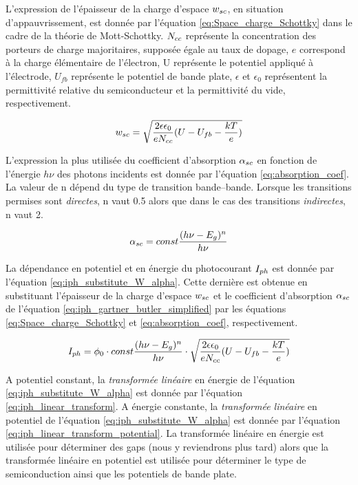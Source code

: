 \begin{refsection}
    L'expression de l'épaisseur de la charge d'espace $w_{sc}$, en situation d'appauvrissement, est donnée par
    l'équation \ref{eq:Space_charge_Schottky} dans le cadre de la théorie de Mott-Schottky. $N_{cc}$ représente la
    concentration des porteurs de charge majoritaires, supposée égale au taux de dopage, $e$ correspond à la charge
    élémentaire de l'électron, U représente le potentiel appliqué à l'électrode, $U_{fb}$ représente le potentiel de
    bande plate, $\epsilon$ et $\epsilon _0$ représentent la permittivité relative du semiconducteur et la
    permittivité du vide, respectivement.
    
    \begin{equation}
        w_{sc} = \sqrt{ \frac{2\epsilon \epsilon _0}{e N_{cc}} (U-U_{fb}-\frac{kT}{e}) }
        \label{eq:Space_charge_Schottky}
    \end{equation}

    L'expression la plus utilisée du coefficient d'absorption $\alpha _{sc}$ en fonction de l'énergie
    $h\nu$ des photons incidents est donnée par l'équation \ref{eq:absorption_coef}. La valeur de n dépend du type
    de transition bande--bande. Lorsque les transitions permises sont \emph{directes}, n vaut 0.5 alors que dans le cas des
    transitions \emph{indirectes}, n vaut 2.

    \begin{equation}
        \alpha _{sc} = const \frac{(h\nu - E_g)^n}{h\nu}
        \label{eq:absorption_coef}
    \end{equation}

    
    La dépendance en potentiel et en énergie du photocourant $I_{ph}$ est donnée par l'équation
    \ref{eq:iph_substitute_W_alpha}. Cette
    dernière est obtenue en substituant l'épaisseur de la charge d'espace
    $w_{sc}$ et le coefficient d'absorption $\alpha _{sc}$ de l'équation \ref{eq:iph_gartner_butler_simplified} par
    les  équations \ref{eq:Space_charge_Schottky} et \ref{eq:absorption_coef}, respectivement.
             
     \begin{equation}
        I_{ph} = \phi _0 \cdot const \frac{(h\nu - E_g)^n}{h\nu}
         \cdot \sqrt{ \frac{2\epsilon \epsilon _0}{e N_{cc}} (U-U_{fb}-\frac{kT}{e}) }
        \label{eq:iph_substitute_W_alpha}
    \end{equation}

    A potentiel constant, la \emph{transformée linéaire} en énergie de l'équation
    \ref{eq:iph_substitute_W_alpha} est donnée par l'équation \ref{eq:iph_linear_transform}. A énergie constante, la \emph{transformée linéaire} en potentiel
    de l'équation \ref{eq:iph_substitute_W_alpha} est donnée par l'équation \ref{eq:iph_linear_transform_potential}.
    La transformée linéaire en énergie est utilisée pour déterminer des gaps (nous y reviendrons plus tard) alors que la
    transformée linéaire en potentiel est utilisée pour déterminer le type de semiconduction ainsi que les
    potentiels de bande plate.
    

\end{refsection}
